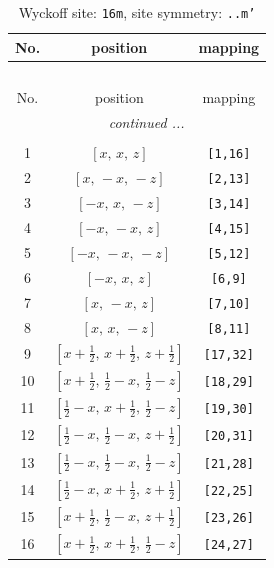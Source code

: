 \documentclass[fleqn,8pt]{jsarticle}
\begin{document}
\renewcommand{\arraystretch}{1.2}
\begin{longtable}{ccc}
\caption{Wyckoff site: {\tt 16m}, site symmetry: {\tt ..m'}}
 \\
 \hline \hline
No. & position & mapping \\ \hline \endfirsthead

\multicolumn{2}{l}{\tablename\ \thetable{}} \\
 \hline \hline
No. & position & mapping \\ \hline \endhead

 \hline \hline
\multicolumn{2}{r}{\footnotesize\it continued ...} \\ \endfoot

 \hline \hline
\multicolumn{2}{r}{} \\ \endlastfoot

1 & $\left[ x,\, x,\, z \right]$ & {\tt [1,16]} \\ \hline
2 & $\left[ x,\, - x,\, - z \right]$ & {\tt [2,13]} \\ \hline
3 & $\left[ - x,\, x,\, - z \right]$ & {\tt [3,14]} \\ \hline
4 & $\left[ - x,\, - x,\, z \right]$ & {\tt [4,15]} \\ \hline
5 & $\left[ - x,\, - x,\, - z \right]$ & {\tt [5,12]} \\ \hline
6 & $\left[ - x,\, x,\, z \right]$ & {\tt [6,9]} \\ \hline
7 & $\left[ x,\, - x,\, z \right]$ & {\tt [7,10]} \\ \hline
8 & $\left[ x,\, x,\, - z \right]$ & {\tt [8,11]} \\ \hline
9 & $\left[ x + \frac{1}{2},\, x + \frac{1}{2},\, z + \frac{1}{2} \right]$ & {\tt [17,32]} \\ \hline
10 & $\left[ x + \frac{1}{2},\, \frac{1}{2} - x,\, \frac{1}{2} - z \right]$ & {\tt [18,29]} \\ \hline
11 & $\left[ \frac{1}{2} - x,\, x + \frac{1}{2},\, \frac{1}{2} - z \right]$ & {\tt [19,30]} \\ \hline
12 & $\left[ \frac{1}{2} - x,\, \frac{1}{2} - x,\, z + \frac{1}{2} \right]$ & {\tt [20,31]} \\ \hline
13 & $\left[ \frac{1}{2} - x,\, \frac{1}{2} - x,\, \frac{1}{2} - z \right]$ & {\tt [21,28]} \\ \hline
14 & $\left[ \frac{1}{2} - x,\, x + \frac{1}{2},\, z + \frac{1}{2} \right]$ & {\tt [22,25]} \\ \hline
15 & $\left[ x + \frac{1}{2},\, \frac{1}{2} - x,\, z + \frac{1}{2} \right]$ & {\tt [23,26]} \\ \hline
16 & $\left[ x + \frac{1}{2},\, x + \frac{1}{2},\, \frac{1}{2} - z \right]$ & {\tt [24,27]} \\
\end{longtable}
\end{document}
